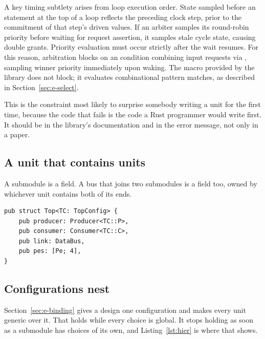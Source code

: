 A key timing subtlety arises from loop execution order. State sampled
before an  statement at the top of a loop reflects the
preceding clock step, prior to the commitment of that step's driven values.
If an arbiter samples its round-robin priority before waiting for request
assertion, it samples stale cycle state, causing double grants. Priority
evaluation must occur strictly after the wait resumes. For this reason,
arbitration blocks on an  condition combining input requests
via \code{||}, sampling winner priority immediately upon waking. The
 macro provided by the library does not block; it evaluates
combinational pattern matches, as described in Section~\ref{sec:e-select}.

\begin{pitfall}
This is the constraint most likely to surprise somebody writing a unit for
the first time, because the code that fails is the code a Rust programmer
would write first. It should be in the library's documentation and in the
error message, not only in a paper.
\end{pitfall}


\subsection{A unit that contains units}
\label{sec:e-hierarchy}

A submodule is a field. A bus that joins two submodules is a field too,
owned by whichever unit contains both of its ends.

\begin{lstlisting}[caption={Submodules and the wire between them are fields of the parent. Each child is generic over its own configuration, not the parent's.},label={lst:hier}]
pub struct Top<TC: TopConfig> {
    pub producer: Producer<TC::P>,
    pub consumer: Consumer<TC::C>,
    pub link: DataBus,
    pub pes: [Pe; 4],
}
\end{lstlisting}

\subsection{Configurations nest}
\label{sec:e-nestedconfig}

Section~\ref{sec:e-binding} gives a design one configuration and makes
every unit generic over it. That holds while every choice is global. It
stops holding as soon as a submodule has choices of its own, and
Listing~\ref{lst:hier} is where that shows.

